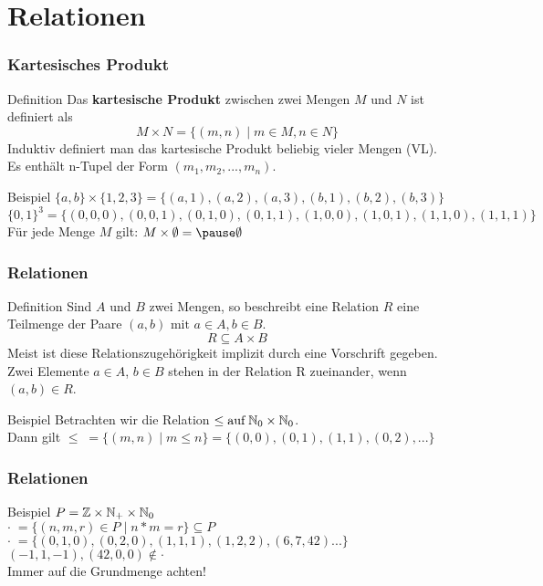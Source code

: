 \section{Relationen}

\begin{frame}
	\frametitle{Kartesisches Produkt}
	\begin{block}{Definition}
		Das \textbf{kartesische Produkt} zwischen zwei Mengen $M$ und $N$ ist definiert als
		$$M \times N = \{ (m,n) \mid m \in M, n \in N \}$$
		Induktiv definiert man das kartesische Produkt beliebig vieler Mengen (VL).\\
		Es enthält n-Tupel der Form $(m_1, m_2, ..., m_n)$.
	\end{block}

	\pause
	\begin{block}{Beispiel}
		$\{a,b\} \times \{1, 2, 3\} = \{(a, 1), (a, 2), (a, 3), (b, 1), (b, 2), (b, 3)\}$ \\
		$\{0, 1\}^3 = \{(0, 0, 0), (0, 0, 1), (0, 1, 0), (0, 1, 1), (1, 0, 0), (1, 0, 1), (1, 1, 0), (1, 1, 1)\} $ \\[0.5em]
		Für jede Menge $M$ gilt: $ M \times \emptyset = \pause \emptyset $
	\end{block}
\end{frame}

\begin{frame}
	\frametitle{Relationen}
	\begin{block}{Definition}
		Sind $A$ und $B$ zwei Mengen, so beschreibt eine Relation $R$ eine Teilmenge der Paare $(a,b) \text{ mit } a \in A, b \in B$.
		$$R \subseteq A \times B$$ Meist ist diese Relationszugehörigkeit implizit durch eine Vorschrift gegeben. \\
		Zwei Elemente $a \in A$, $b \in B$ stehen in der Relation R zueinander, wenn $(a, b) \in R$.
	\end{block}
	
	\pause
	\begin{block}{Beispiel}
		Betrachten wir die Relation $ \leq \text{auf} \; \mathbb{N}_0 \times \mathbb{N}_0 $. \\
		Dann gilt $ \leq \; = \{(m, n) \mid m \leq n \} = \{(0, 0), (0, 1), (1, 1), (0, 2), ...\} $
	\end{block}
\end{frame}

\begin{frame}
	\frametitle{Relationen}	
	\begin{block}{Beispiel}
		$ P = \mathbb{Z} \times \mathbb{N}_+ \times \mathbb{N}_0 $ \\
		$ \cdot \; = \{(n, m, r) \in P \mid n * m = r \} \subseteq P $ \\[0.5em]
		\pause
		$ \cdot \; = \{(0, 1, 0), (0, 2, 0), (1, 1, 1), (1, 2, 2), (6, 7, 42) ...\} $ \\[0.5em]
		$ (-1, 1, -1), (42, 0, 0) \notin \cdot $\\[1em]
		\pause
		Immer auf die Grundmenge achten!
	\end{block}
\end{frame}

